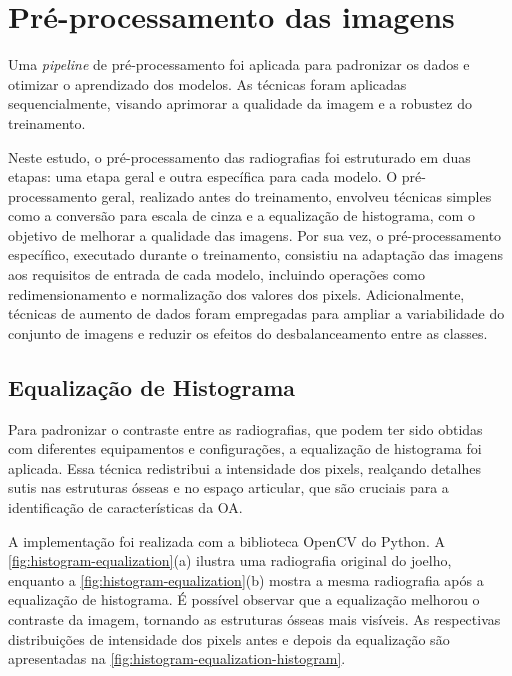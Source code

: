 \section{Pré-processamento das imagens}

Uma \textit{pipeline} de pré-processamento foi aplicada para padronizar os dados e otimizar o aprendizado dos modelos. As técnicas foram aplicadas sequencialmente, visando aprimorar a qualidade da imagem e a robustez do treinamento.

Neste estudo, o pré-processamento das radiografias foi estruturado em duas etapas: uma etapa geral e outra específica para cada modelo. O pré-processamento geral, realizado antes do treinamento, envolveu técnicas simples como a conversão para escala de cinza e a equalização de histograma, com o objetivo de melhorar a qualidade das imagens. Por sua vez, o pré-processamento específico, executado durante o treinamento, consistiu na adaptação das imagens aos requisitos de entrada de cada modelo, incluindo operações como redimensionamento e normalização dos valores dos pixels. Adicionalmente, técnicas de aumento de dados foram empregadas para ampliar a variabilidade do conjunto de imagens e reduzir os efeitos do desbalanceamento entre as classes.

\subsection{Equalização de Histograma}

Para padronizar o contraste entre as radiografias, que podem ter sido obtidas com diferentes equipamentos e configurações, a equalização de histograma foi aplicada. Essa técnica redistribui a intensidade dos pixels, realçando detalhes sutis nas estruturas ósseas e no espaço articular, que são cruciais para a identificação de características da OA.

A implementação foi realizada com a biblioteca OpenCV \cite{opencv} do Python. A \autoref{fig:histogram-equalization}(a) ilustra uma radiografia original do joelho, enquanto a \autoref{fig:histogram-equalization}(b) mostra a mesma radiografia após a equalização de histograma. É possível observar que a equalização melhorou o contraste da imagem, tornando as estruturas ósseas mais visíveis. As respectivas distribuições de intensidade dos pixels antes e depois da equalização são apresentadas na \autoref{fig:histogram-equalization-histogram}.

